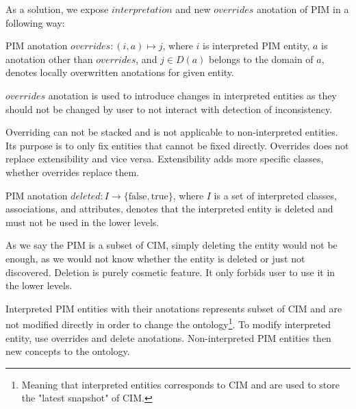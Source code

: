 \smallskip

As a solution, we expose $interpretation$ and new $overrides$ anotation of PIM in a following way:


\begin{definition}[overrides]
    PIM anotation $overrides: (i, a) \mapsto j$, where $i$ is interpreted PIM entity, $a$ is anotation other than $overrides$, and $j \in D(a)$ belongs to the domain of $a$, denotes locally overwritten anotations for given entity.
\end{definition}

$overrides$ anotation is used to introduce changes in interpreted entities as they should not be changed by user to not interact with detection of inconsistency.

Overriding can not be stacked and is not applicable to non-interpreted entities. Its purpose is to only fix entities that cannot be fixed directly. Overrides does not replace extensibility and vice versa. Extensibility adds more specific classes, whether overrides replace them.

\begin{definition}[deleted]
    PIM anotation $deleted: I \rightarrow \{\textrm{false}, \textrm{true}\}$, where $I$ is a set of interpreted classes, associations, and attributes, denotes that the interpreted entity is deleted and must not be used in the lower levels.
\end{definition}

As we say the PIM is a subset of CIM, simply deleting the entity would not be enough, as we would not know whether the entity is deleted or just not discovered. Deletion is purely cosmetic feature. It only forbids user to use it in the lower levels.

\begin{notation}
    Interpreted PIM entities with their anotations represents subset of CIM and are not modified directly in order to change the ontology\footnote{Meaning that interpreted entities corresponds to CIM and are used to store the "latest snapshot" of CIM.}. To modify interpreted entity, use overrides and delete anotations. Non-interpreted PIM entities then new concepts to the ontology.
\end{notation}

